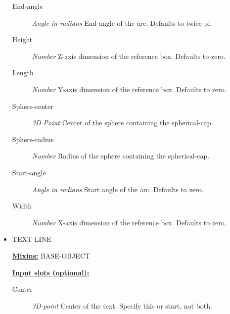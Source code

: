 \documentclass [11pt]{book}
\begin{document}
\begin{itemize}
\begin{description}
\item [End-angle]
\emph{Angle in radians} End angle of the arc. Defaults to twice pi.


\item [Height]
\emph{Number} Z-axis dimension of the reference box. Defaults to zero.


\item [Length]
\emph{Number} Y-axis dimension of the reference box. Defaults to zero.


\item [Sphere-center]
\emph{3D Point} Center of the sphere containing the spherical-cap.


\item [Sphere-radius]
\emph{Number} Radius of the sphere containing the spherical-cap.


\item [Start-angle]
\emph{Angle in radians} Start angle of the arc. Defaults to zero.


\item [Width]
\emph{Number} X-axis dimension of the reference box. Defaults to zero.


\end{description}







\item {}TEXT-LINE


\textbf{
\underline{Mixins:}} BASE-OBJECT





\begin{description}

\end{description}








\textbf{
\underline{Input slots (optional):}}

\begin{description}

\item [Center]
\emph{3D-point} Center of the text. Specify this or start, not both.



\end{description}
\end{itemize}
\end{document}
